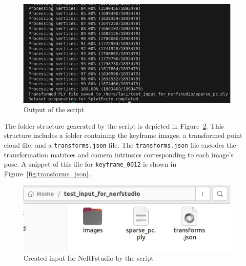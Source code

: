 \begin{figure}[htbp]
	\centering
	\includegraphics[width=150mm, keepaspectratio]{figures_jpg/create_splatfacto_script_cli.jpg}
	\caption{Output of the script}
	\label{fig:create_splatfacto_script_cli}
\end{figure}

The folder structure generated by the script is depicted in Figure~\ref{fig:nerfstudio_input_by_my_script}. This structure includes a folder containing the keyframe images, a transformed point cloud file, and a \verb|transforms.json| file. The \verb|transforms.json| file encodes the transformation matrices and camera intrinsics corresponding to each image's pose. A snippet of this file for \verb|keyframe_0012| is shown in Figure~\ref{fig:transforms_json}.
\begin{figure}[htbp]
	\centering
	\includegraphics[width=150mm, keepaspectratio]{figures_jpg/nerfstudio_input_by_my_script.jpg}
	\caption{Created input for NeRFstudio by the script}
	\label{fig:nerfstudio_input_by_my_script}
\end{figure}

